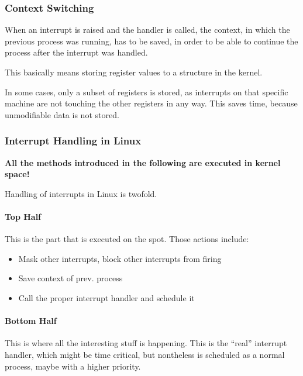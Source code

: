 \documentclass[english]{panikzettel}
\newcommand{\alert}[1]{\textbf{\textcolor{red!75!black}{#1}}}
\begin{document}
	\subsubsection{Context Switching}
	\label{sss-context-switching}
	
	When an interrupt is raised and the handler is called, the context, in which the previous process was running, has to be saved, in order to be able to continue the process after the interrupt was handled.

	This basically means storing register values to a structure in the kernel.

	In some cases, only a subset of registers is stored, as interrupts on that specific machine are not touching the other registers in any way. 
	This saves time, because unmodifiable data is not stored.

	\subsubsection{Interrupt Handling in Linux}
	\label{sss-interrupt-handling-in-linux}
	
	\alert{All the methods introduced in the following are executed in kernel space!}

	Handling of interrupts in Linux is twofold.
	
	\paragraph{Top Half}
	\label{pgf-top-half}
	
	This is the part that is executed on the spot.
	Those actions include:
	\begin{itemize}
		\item Mask other interrupts, block other interrupts from firing
		\item Save context of prev. process
		\item Call the proper interrupt handler and schedule it
	\end{itemize}

	\paragraph{Bottom Half}
	\label{pgf-bottom-half}
	
	This is where all the interesting stuff is happening.
	This is the \enquote{real} interrupt handler, which might be time critical, but nontheless is scheduled as a normal process, maybe with a higher priority.
\end{document}
